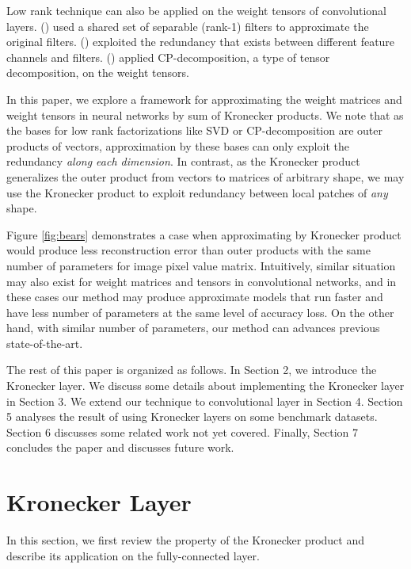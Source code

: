 \documentclass{article}
\begin{document}
Low rank technique can also be applied on the weight tensors of convolutional layers. \citeauthor{rigamonti2013learning}
(\citeyear{rigamonti2013learning}) used a shared set of separable (rank-1) filters to approximate the original filters. \citeauthor{DBLP:conf/bmvc/JaderbergVZ14} (\citeyear{DBLP:conf/bmvc/JaderbergVZ14}) exploited the redundancy that exists between different feature channels and filters.  \citeauthor{lebedev2014speeding} (\citeyear{lebedev2014speeding}) applied CP-decomposition, a type of tensor decomposition, on the weight tensors.

In this paper, we explore a framework for approximating the weight matrices and weight tensors in neural networks by sum of Kronecker products.
 We note that as
 the bases for low rank factorizations like SVD or CP-decomposition are outer products of vectors, approximation by these bases can only exploit the redundancy \emph{along each dimension}. In contrast, as the Kronecker product generalizes the outer product from vectors to matrices of arbitrary shape, we may use the Kronecker product to exploit
 redundancy between local patches of \emph{any} shape.

 Figure \ref{fig:bears} demonstrates a case when approximating by Kronecker product would produce less reconstruction error than outer products with
 the same number of parameters for image pixel value matrix. Intuitively, similar situation may also exist for weight matrices and tensors in
 convolutional networks, and in these cases our method may produce approximate models that run faster and have less number of parameters at the same
 level of accuracy loss. On the other hand, with similar number of parameters, our method can advances previous state-of-the-art.

The rest of this paper is organized as follows. In Section 2, we introduce the Kronecker layer. We discuss some details about implementing the Kronecker layer in Section 3. We extend our technique to convolutional layer in Section 4. Section 5 analyses the result of using Kronecker layers on some benchmark datasets. Section 6 discusses some related work not yet covered. Finally, Section 7 concludes the paper and discusses future work.

\section{Kronecker Layer}
In this section, we first review the property of the Kronecker product and describe its application on the fully-connected layer.
\end{document}
